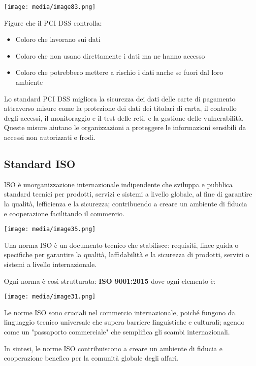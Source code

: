 \texttt{[image: media/image83.png]}

Figure che il PCI DSS controlla:

\begin{itemize}
\item
  Coloro che lavorano sui dati
\item
  Coloro che non usano direttamente i dati ma ne hanno accesso
\item
  Coloro che potrebbero mettere a rischio i dati anche se fuori dal loro
  ambiente
\end{itemize}

Lo standard PCI DSS migliora la sicurezza dei dati delle carte di
pagamento attraverso misure come la protezione dei dati dei titolari di
carta, il controllo degli accessi, il monitoraggio e il test delle reti,
e la gestione delle vulnerabilità. Queste misure aiutano le
organizzazioni a proteggere le informazioni sensibili da accessi non
autorizzati e frodi.

\subsection{Standard ISO}\label{standard-iso}

ISO è un\textquotesingle organizzazione internazionale indipendente che
sviluppa e pubblica standard tecnici per prodotti, servizi e sistemi a
livello globale, al fine di garantire la qualità,
l\textquotesingle efficienza e la sicurezza; contribuendo a creare un
ambiente di fiducia e cooperazione facilitando il commercio.

\texttt{[image: media/image35.png]}

Una norma ISO è un documento tecnico che stabilisce: requisiti, linee
guida o specifiche per garantire la qualità,
l\textquotesingle affidabilità e la sicurezza di prodotti, servizi o
sistemi a livello internazionale.

Ogni norma è così strutturata: \textbf{ISO 9001:2015} dove ogni elemento
è:

\texttt{[image: media/image31.png]}

Le norme ISO sono cruciali nel commercio internazionale, poiché fungono
da linguaggio tecnico universale che supera barriere linguistiche e
culturali; agendo come un "passaporto commerciale" che semplifica gli
scambi internazionali.

In sintesi, le norme ISO contribuiscono a creare un ambiente di fiducia
e cooperazione benefico per la comunità globale degli affari.

